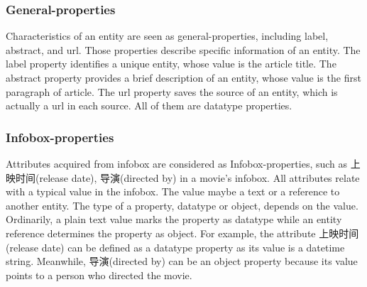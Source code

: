\documentclass[runningheads,a4paper]{llncs}
\begin{document}
\subsubsection{General-properties}
Characteristics of an entity are seen as general-properties, including label, abstract, and url. Those properties describe specific information of an entity. The label property identifies a unique entity, whose value is the article title. The abstract property provides a brief description of an entity, whose value is the first paragraph of article. The url property saves the source of an entity, which is actually a url in each source. All of them are datatype properties.

\subsubsection{Infobox-properties}
Attributes acquired from infobox are considered as Infobox-properties, such as 上映时间(release date), 导演(directed by) in a movie's infobox. All attributes relate with a typical value in the infobox. The value maybe a text or a reference to another entity. The type of a property, datatype or object, depends on the value. Ordinarily, a plain text value marks the property as datatype while an entity reference determines the property as object. For example, the attribute 上映时间(release date) can be defined as a datatype property as its value is a datetime string. Meanwhile, 导演(directed by) can be an object property because its value points to a person who directed the movie.
\end{document}
